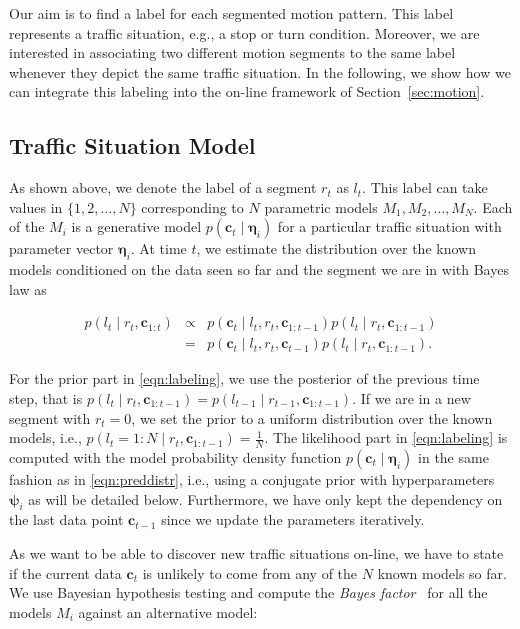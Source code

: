 Our aim is to find a label for each segmented motion pattern. This label
represents a traffic situation, e.g., a stop or turn condition. Moreover, we are
interested in associating two different motion segments to the same label
whenever they depict the same traffic situation. In the following, we show how
we can integrate this labeling into the on-line framework of
Section~\ref{sec:motion}.

\subsection{Traffic Situation Model}
As shown above, we denote the label of a segment $r_t$ as $l_t$. This label can
take values in $\{1,2,\dots,N\}$ corresponding to $N$ parametric models $M_1,
M_2,\dots,M_N$. Each of the $M_i$ is a generative model $p(\mathbf{c}_t\mid
\boldsymbol{\eta}_i)$ for a particular traffic situation with parameter vector
$\boldsymbol{\eta}_i$. At time $t$, we estimate the distribution over the known
models conditioned on the data seen so far and the segment we are in with Bayes
law as

\begin{eqnarray}
\label{eqn:labeling}
p(l_t\mid r_t,\mathbf{c}_{1:t})&\propto&p(\mathbf{c}_t\mid l_t,r_t,
\mathbf{c}_{1:t-1})p(l_t\mid r_t,\mathbf{c}_{1:t-1})\nonumber\\
&=& p(\mathbf{c}_t\mid l_t,r_t,\mathbf{c}_{t-1})p(l_t\mid
r_t,\mathbf{c}_{1:t-1}).
\end{eqnarray}

For the prior part in \eqref{eqn:labeling}, we use the posterior of the previous
time step, that is
$p(l_t\mid r_t,\mathbf{c}_{1:t-1})=p(l_{t-1}\mid r_{t-1},\mathbf{c}_{1:t-1})$.
If we are in a new segment with $r_t=0$, we set the prior to a uniform
distribution over the known models, i.e.,
$p(l_t=1:N\mid r_t,\mathbf{c}_{1:t-1})=\frac{1}{N}$. The likelihood part in
\eqref{eqn:labeling} is computed with the model probability density function
$p(\mathbf{c}_t\mid \boldsymbol{\eta}_i)$ in the same fashion as in
\eqref{eqn:preddistr}, i.e., using a conjugate prior with hyperparameters
$\boldsymbol{\psi}_i$ as will be detailed below. Furthermore, we have only kept
the dependency on the last data point $\mathbf{c}_{t-1}$ since we update the
parameters iteratively.

As we want to be able to discover new traffic situations on-line, we have to
state if the current data $\mathbf{c}_t$ is unlikely to come from any of the
$N$ known models so far. We use Bayesian hypothesis testing and compute
the \emph{Bayes factor}~\cite{kass95bayes} for all the models $M_i$ against an
alternative model:

